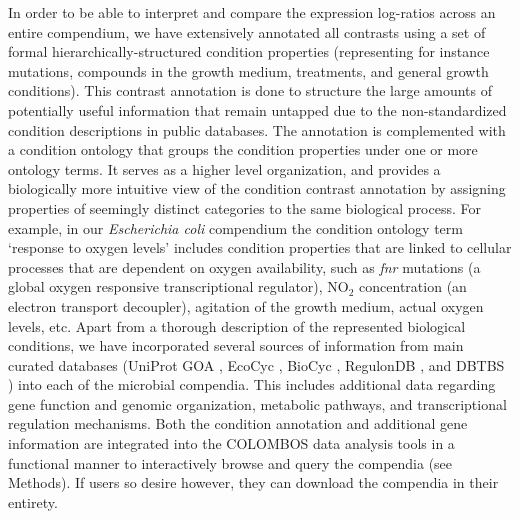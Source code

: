 In order to be able to interpret and compare the expression log-ratios across an entire compendium, we have extensively annotated all contrasts using a set of formal hierarchically-structured condition properties (representing for instance mutations, compounds in the growth medium, treatments, and general growth conditions). This contrast annotation is done to structure the large amounts of potentially useful information that remain untapped due to the non-standardized condition descriptions in public databases. The annotation is complemented with a condition ontology that groups the condition properties under one or more ontology terms. It serves as a higher level organization, and provides a biologically more intuitive view of the condition contrast annotation by assigning properties of seemingly distinct categories to the same biological process. For example, in our {\it Escherichia coli} compendium the condition ontology term `response to oxygen levels' includes condition properties that are linked to cellular processes that are dependent on oxygen availability, such as {\it fnr} mutations (a global oxygen responsive transcriptional regulator), NO$_2$ concentration (an electron transport decoupler), agitation of the growth medium, actual oxygen levels, etc. Apart from a thorough description of the represented biological conditions, we have incorporated several sources of information from main curated databases (UniProt GOA \cite{Camon2004}, EcoCyc \cite{Keseler2009}, BioCyc \cite{Caspi2008}, RegulonDB \cite{Gama-Castro2008}, and DBTBS \cite{Sierro2008}) into each of the microbial compendia. This includes additional data regarding gene function and genomic organization, metabolic pathways, and transcriptional regulation mechanisms. Both the condition annotation and additional gene information are integrated into the COLOMBOS data analysis tools in a functional manner to interactively browse and query the compendia (see Methods). If users so desire however, they can download the compendia in their entirety.



